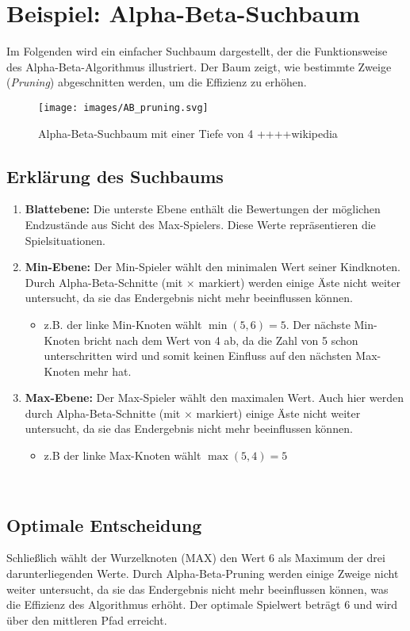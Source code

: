 \section*{Beispiel: Alpha-Beta-Suchbaum}

Im Folgenden wird ein einfacher Suchbaum dargestellt, der die Funktionsweise des Alpha-Beta-Algorithmus illustriert. Der Baum zeigt, wie bestimmte Zweige (\textit{Pruning}) abgeschnitten werden, um die Effizienz zu erhöhen.

\begin{figure}[H]
	\centering
	\texttt{[image: images/AB\_pruning.svg]}
	\caption{Alpha-Beta-Suchbaum mit einer Tiefe von 4 ++++wikipedia}
	\label{fig:abpruning}
\end{figure}

\subsection*{Erklärung des Suchbaums}

\begin{enumerate} \item \textbf{Blattebene:} Die unterste Ebene enthält die Bewertungen der möglichen Endzustände aus Sicht des Max-Spielers. Diese Werte repräsentieren die Spielsituationen.
	\item \textbf{Min-Ebene:} Der Min-Spieler wählt den minimalen Wert seiner Kindknoten. Durch Alpha-Beta-Schnitte (mit $\times$ markiert) werden einige Äste nicht weiter untersucht, da sie das Endergebnis nicht mehr beeinflussen können. \begin{itemize} \item z.B. der linke Min-Knoten wählt $\min(5, 6) = 5$. Der nächste Min-Knoten bricht nach dem Wert von 4 ab, da die Zahl von 5 schon unterschritten wird und somit keinen Einfluss auf den nächsten Max-Knoten mehr hat.
    \end{itemize}
	\item \textbf{Max-Ebene:} Der Max-Spieler wählt den maximalen Wert. Auch hier werden durch Alpha-Beta-Schnitte (mit $\times$ markiert) einige Äste nicht weiter untersucht, da sie das Endergebnis nicht mehr beeinflussen können. 
	\begin{itemize} \item z.B der linke Max-Knoten wählt $\max(5, 4) = 5$  
	\end{itemize}
	 \end{enumerate}

\subsection*{Optimale Entscheidung}
Schließlich wählt der Wurzelknoten (MAX) den Wert 6 als Maximum der drei darunterliegenden Werte. Durch Alpha-Beta-Pruning werden einige Zweige nicht weiter untersucht, da sie das Endergebnis nicht mehr beeinflussen können, was die Effizienz des Algorithmus erhöht. Der optimale Spielwert beträgt 6 und wird über den mittleren Pfad erreicht.

